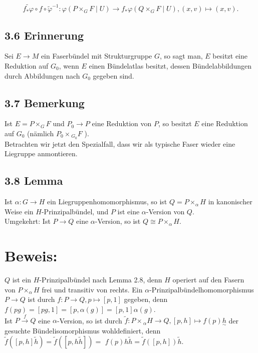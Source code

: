 \documentclass[10pt, letterpaper]{article}
\begin{document}
$$
\widetilde{f_{*} \varphi} \circ f \circ \tilde{\varphi}^{-1}: \varphi\left(P \times_{G} F \mid U\right) \rightarrow f_{*} \varphi\left(Q \times_{G} F \mid U\right),(x, v) \mapsto(x, v) .
$$

\subsection*{3.6 Erinnerung}
Sei $E \rightarrow M$ ein Faserbündel mit Strukturgruppe $G$, so sagt man, $E$ besitzt eine Reduktion auf $G_{0}$, wenn $E$ einen Bündelatlas besitzt, dessen Bündelabbildungen durch Abbildungen nach $G_{0}$ gegeben sind.

\subsection*{3.7 Bemerkung}
Ist $E=P \times_{G} F$ und $P_{0} \rightarrow P$ eine Reduktion von $P$, so besitzt $E$ eine Reduktion auf $G_{0}$ (nämlich $P_{0} \times{ }_{G_{0}} F$ ).\\
Betrachten wir jetzt den Spezialfall, dass wir als typische Faser wieder eine Liegruppe anmontieren.

\subsection*{3.8 Lemma}
Ist $\alpha: G \rightarrow H$ ein Liegruppenhomomorphismus, so ist $Q=P \times_{\alpha} H$ in kanonischer Weise ein $H$-Prinzipalbündel, und $P$ ist eine $\alpha$-Version von $Q$.\\
Umgekehrt: Ist $P \rightarrow Q$ eine $\alpha$-Version, so ist $Q \cong P \times_{\alpha} H$.

\section*{Beweis:}
$Q$ ist ein $H$-Prinzipalbündel nach Lemma 2.8, denn $H$ operiert auf den Fasern von $P \times_{\alpha} H$ frei und transitiv von rechts. Ein $\alpha$-Prinzipalbündelhomomorphismus $P \rightarrow Q$ ist durch $f: P \rightarrow Q, p \mapsto[p, 1]$ gegeben, denn $f(p g)=[p g, 1]=[p, \alpha(g)]=[p, 1] \alpha(g)$.\\
Ist $P \xrightarrow{f} Q$ eine $\alpha$-Version, so ist durch $\tilde{f}: P \times{ }_{\alpha} H \rightarrow Q,[p, h] \mapsto f(p) \underset{\sim}{h}$ der gesuchte Bündelisomorphismus wohldefiniert, denn $\tilde{f}([p, h] \tilde{h})=\tilde{f}([p, h \tilde{h}])=$ $f(p) h \tilde{h}=\tilde{f}([p, h]) \tilde{h}$.
\end{document}
